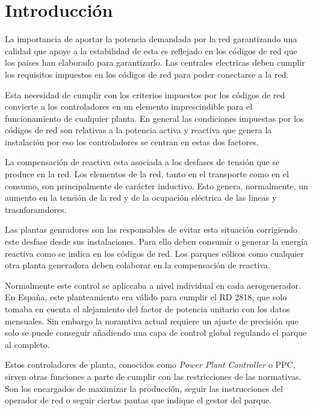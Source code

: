 \documentclass{book}
\begin{document}
\tableofcontents %

\chapter{Introducci\'on}

La importancia de aportar la potencia demandada por la red garantizando una calidad que apoye a la estabilidad de esta es reflejado en los c\'odigos de red que los paises han elaborado para garantizarlo. Las centrales electricas deben cumplir los requisitos impuestos en los c\'odigos de red para poder conectarse a la red. \par

Esta necesidad de cumplir con los criterios impuestos por los c\'odigos de red convierte a los controladores en un elemento imprescindible para el funcionamiento de cualquier planta. En general las condiciones impuestas por los c\'odigos de red son relativas a la potencia activa y reactiva que genera la instalaci\'on por eso los controladores se centran en estas dos factores. \par

La compensaci\'on de reactiva esta asociada a los desfases de tensi\'on que se produce en la red. Los elementos de la red, tanto en el transporte como en el consumo, son principalmente de car\'acter inductivo. Esto genera, normalmente, un aumento en la tensi\'on de la red y de la ocupaci\'on el\'ectrica de las lineas y trasnforamdores. \par

Las plantas genradores son las responsables de evitar esta situaci\'on corrigiendo este desfase desde sus instalaciones. Para ello deben consumir o generar la energ\'ia reactiva como se indica en los c\'odigos de red. Los parques e\'olicos como cualquier otra planta generadora deben colaborar en la compensaci\'on de reactiva. \par

Normalmente este control se apliccaba a nivel individual en cada aerogenerador. En España, este planteamiento era v\'alido para cumplir el RD 2818, que solo tomaba en cuenta el alejamiento del factor de potencia unitario con los datos mensuales. Sin embargo la noramtiva actual requiere un ajuste de precisi\'on que solo se puede conseguir añadiendo una capa de control global regulando el parque al completo. \par

Estos controladores de planta, conocidos como \emph{Power Plant Controller} o PPC, sirven otras funciones a parte de cumplir con las restricciones de las normativas. Son los encargados de maximizar la producci\'on, seguir las instrucciones del operador de red o seguir ciertas pautas que indique el gestor del parque. \par
\end{document}
